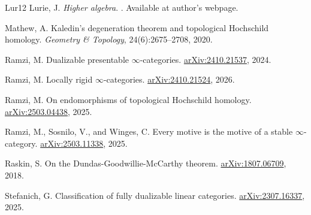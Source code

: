 \documentclass{article}
\theoremstyle{definition}
\begin{document}
\begin{thebibliography}{Lur12}
Lurie, J.
\newblock \emph{Higher algebra}.
. Available at author's webpage.


Mathew, A.
\newblock Kaledin’s degeneration theorem and topological {Hochschild} homology.
\newblock \emph{Geometry \& Topology}, 24(6):2675--2708, 2020.

Ramzi, M.
\newblock Dualizable presentable {$\infty$}-categories.
\newblock \href{https://arxiv.org/abs/2410.21537}{arXiv:2410.21537}, 2024.

 

Ramzi, M.
\newblock Locally rigid {$\infty$}-categories.
\newblock \href{https://arxiv.org/abs/2410.21524}{arXiv:2410.21524}, 2026.

Ramzi, M.
\newblock On endomorphisms of topological {Hochschild} homology.
\newblock \href{https://arxiv.org/abs/2503.04438}{arXiv:2503.04438}, 2025.

Ramzi, M., Sosnilo, V., and Winges, C.
\newblock Every motive is the motive of a stable {$\infty$}-category.
\newblock \href{https://arxiv.org/abs/2503.11338}{arXiv:2503.11338}, 2025.

Raskin, S.
\newblock On the {Dundas-Goodwillie-McCarthy} theorem.
\newblock \href{https://arxiv.org/abs/1807.06709}{arXiv:1807.06709}, 2018.


Stefanich, G.
\newblock Classification of fully dualizable linear categories.
\newblock \href{https://arxiv.org/abs/2307.16337}{arXiv:2307.16337}, 2025.


\end{thebibliography}
\end{document}
